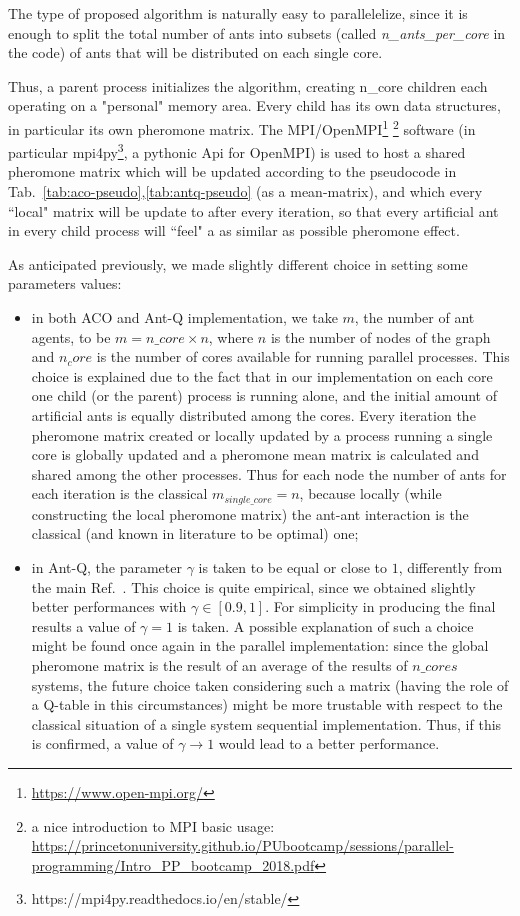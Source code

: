 \documentclass[10pt]{article}
\begin{document}
The type of proposed algorithm is naturally easy to parallelelize, since it is enough to split the total number of ants into subsets (called \textit{n\_ants\_per\_core} in the code) of ants that will be distributed on each single core.

Thus, a parent process initializes the algorithm, creating n\_core children each operating on a "personal" memory area. 
Every child has its own data structures, in particular its own pheromone matrix. 
The MPI/OpenMPI\footnote{\url{https://www.open-mpi.org/}} \footnote{a nice introduction to MPI basic usage: \url{https://princetonuniversity.github.io/PUbootcamp/sessions/parallel-programming/Intro_PP_bootcamp_2018.pdf}} software (in particular mpi4py\footnote{https://mpi4py.readthedocs.io/en/stable/}, a pythonic Api for OpenMPI) is used to host a shared pheromone matrix which will be updated according to the pseudocode in Tab.~\ref{tab:aco-pseudo},\ref{tab:antq-pseudo} (as a mean-matrix), and which every ``local" matrix will be update to after every iteration, so that every artificial ant in every child process will ``feel" a as similar as possible pheromone effect.

As anticipated previously, we made slightly different choice in setting some parameters values:
\begin{itemize}
\item in both ACO and Ant-Q implementation, we take $m$, the number of ant agents, to be $m=n\_core\times n$, where $n$ is the number of nodes of the graph and $n_core$ is the number of cores available for running parallel processes.
This choice is explained due to the fact that in our implementation on each core one child (or the parent) process is running alone, and the initial amount of artificial ants is equally distributed among the cores. Every iteration the pheromone matrix created or locally updated by a process running a single core is globally updated and a pheromone mean matrix is calculated and shared among the other processes. Thus for each node the number of ants for each iteration is the classical $m_{single\_core}=n$, because locally (while constructing the local pheromone matrix) the ant-ant interaction is the classical (and known in literature to be optimal) one;
\item in Ant-Q, the parameter $\gamma$ is taken to be equal or close to $1$, differently from the main Ref.~\cite{undici}. This choice is quite empirical, since we obtained slightly better performances with $\gamma \in [0.9,1]$. For simplicity in producing the final results a value of $\gamma=1$ is taken. A possible explanation of such a choice might be found once again in the parallel implementation: since the global pheromone matrix is the result of an average of the results of $n\_cores$ systems, the future choice taken considering such a matrix (having the role of a Q-table in this circumstances) might be more trustable with respect to the classical situation of a single system sequential implementation. Thus, if this is confirmed, a value of $\gamma \rightarrow 1$ would lead to a better performance.
\end{itemize}
\end{document}
